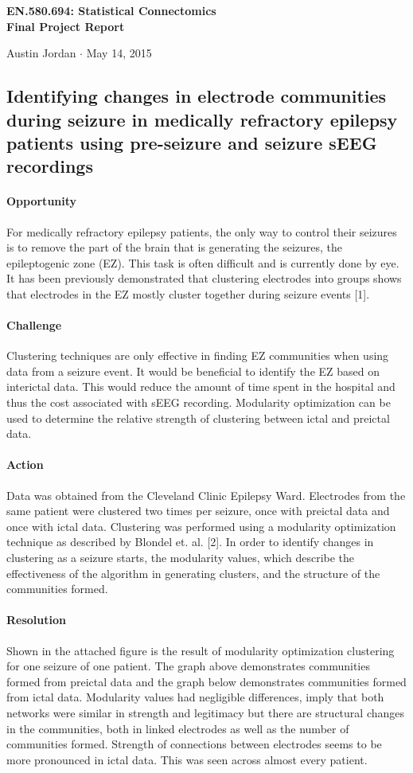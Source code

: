 \documentclass[12pt]{article}
\begin{document}
\begin{center}\Large \bf EN.580.694: Statistical Connectomics \\ Final Project Report \end{center}
\begin{center} Austin Jordan $\cdot$  May 14, 2015 \end{center}

\subsection*{Identifying changes in electrode communities during seizure in medically refractory epilepsy patients using pre-seizure and seizure sEEG recordings}

\paragraph{Opportunity}
For medically refractory epilepsy patients, the only way to control their seizures is to remove the part of the brain that is generating the seizures, the epileptogenic zone (EZ). This task is often difficult and is currently done by eye. It has been previously demonstrated that clustering electrodes into groups shows that electrodes in the EZ mostly cluster together during seizure events [1].
\paragraph{Challenge}
Clustering techniques are only effective in finding EZ communities when using data from a seizure event. It would be beneficial to identify the EZ based on interictal data. This would reduce the amount of time spent in the hospital and thus the cost associated with sEEG recording. Modularity optimization can be used to determine the relative strength of clustering between ictal and preictal data.
\paragraph{Action}
Data was obtained from the Cleveland Clinic Epilepsy Ward. Electrodes from the same patient were clustered two times per seizure, once with preictal data and once with ictal data. Clustering was performed using a modularity optimization technique as described by Blondel et. al. [2]. In order to identify changes in clustering as a seizure starts, the modularity values, which describe the effectiveness of the algorithm in generating clusters, and the structure of the communities formed.
\paragraph{Resolution}
Shown in the attached figure is the result of modularity optimization clustering for one seizure of one patient. The graph above demonstrates communities formed from preictal data and the graph below demonstrates communities formed from ictal data. Modularity values had negligible differences, imply that both networks were similar in strength and legitimacy but there are structural changes in the communities, both in linked electrodes as well as the number of communities formed. Strength of connections between electrodes seems to be more pronounced in ictal data. This was seen across almost every patient.
\end{document}

